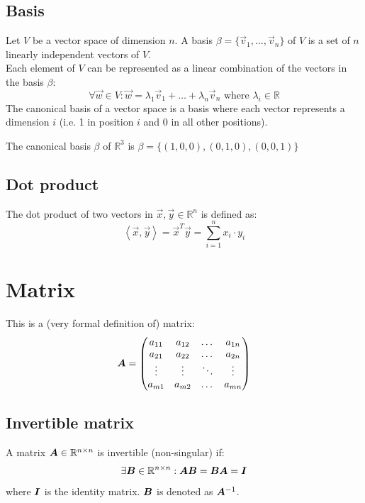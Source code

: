 \subsection{Basis}
Let $V$ be a vector space of dimension $n$.
A basis $\beta = \{ \vec{v}_1, \dots, \vec{v}_n \}$ of $V$ is a set of $n$ linearly independent vectors of $V$.\\ 
Each element of $V$ can be represented as a linear combination of the vectors in the basis $\beta$:
\[ \forall \vec{w} \in V: \vec{w} = \lambda_1\vec{v}_1 + \dots + \lambda_n\vec{v}_n \text{ where } \lambda_i \in \mathbb{R} \]
%
The canonical basis of a vector space is a basis where each vector represents a dimension $i$ 
(i.e. 1 in position $i$ and 0 in all other positions).
\begin{example}
    The canonical basis $\beta$ of $\mathbb{R}^3$ is $\beta = \{ (1, 0, 0), (0, 1, 0), (0, 0, 1) \}$
\end{example}

\subsection{Dot product}
The dot product of two vectors in $\vec{x}, \vec{y} \in \mathbb{R}^n$ is defined as: 
\begin{equation*}
    \left\langle \vec{x}, \vec{y} \right\rangle =
    \vec{x}^T \vec{y} = \sum_{i=1}^{n} x_i \cdot y_i
\end{equation*}


\section{Matrix}

This is a {\tiny(very formal definition of)} matrix: 
\begin{equation*}
    {\bm{A}} =
    \begin{pmatrix}
        a_{11} & a_{12} & \dots  & a_{1n} \\
        a_{21} & a_{22} & \dots  & a_{2n} \\
        \vdots & \vdots & \ddots & \vdots \\
        a_{m1} & a_{m2} & \dots  & a_{mn}
    \end{pmatrix}
\end{equation*}

\subsection{Invertible matrix}
A matrix ${\bm{A}} \in \mathbb{R}^{n \times n}$ is invertible (non-singular) if: 
\begin{equation*}
    \exists {\bm{B}} \in \mathbb{R}^{n \times n}: {\bm{AB}} = {\bm{BA}} = {\bm{I}}
\end{equation*}
where ${\bm{I}}$ is the identity matrix. ${\bm{B}}$ is denoted as ${\bm{A}}^{-1}$.


